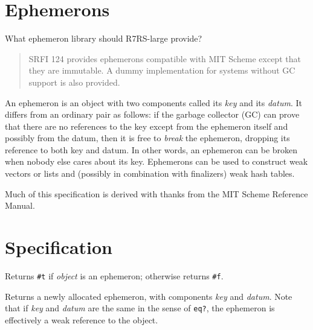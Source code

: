 \section{Ephemerons}
  What ephemeron library should R7RS-large provide?

\begin{quote}
SRFI 124 provides ephemerons compatible with MIT Scheme except that they
are immutable. A dummy implementation for systems without GC support is
also provided.
\end{quote}


An ephemeron is an object with two components called its \emph{key} and
its \emph{datum}. It differs from an ordinary pair as follows: if the
garbage collector (GC) can prove that there are no references to the key
except from the ephemeron itself and possibly from the datum, then it is
free to \emph{break} the ephemeron, dropping its reference to both key
and datum. In other words, an ephemeron can be broken when nobody else
cares about its key. Ephemerons can be used to construct weak vectors or
lists and (possibly in combination with finalizers) weak hash tables.

Much of this specification is derived with thanks from the MIT Scheme
Reference Manual.


\section{Specification}\label{specification}

\begin{entry}{%
  }

  Returns \texttt{\#t} if \emph{object} is an ephemeron; otherwise
  returns \texttt{\#f}.
\end{entry}

\begin{entry}{%
  }

  Returns a newly allocated ephemeron, with components \emph{key} and
  \emph{datum}. Note that if \emph{key} and \emph{datum} are the same
  in the sense of \texttt{eq?}, the ephemeron is effectively a weak
  reference to the object.
\end{entry}

